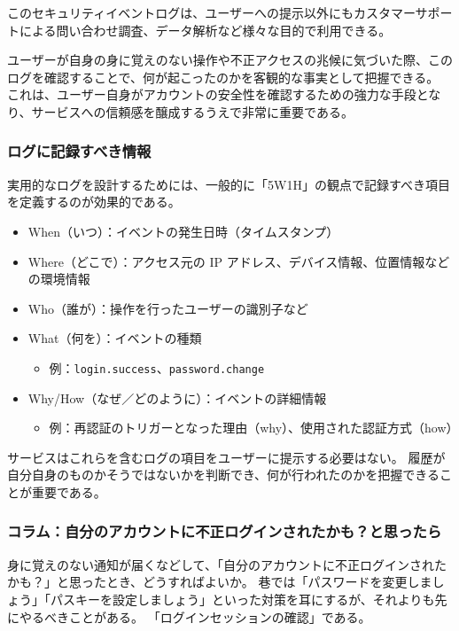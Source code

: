 \documentclass[uplatex]{jsarticle}
\def\label#1{}%
\begin{document}
このセキュリティイベントログは、ユーザーへの提示以外にもカスタマーサポートによる問い合わせ調査、データ解析など様々な目的で利用できる。

ユーザーが自身の身に覚えのない操作や不正アクセスの兆候に気づいた際、このログを確認することで、何が起こったのかを客観的な事実として把握できる。
これは、ユーザー自身がアカウントの安全性を確認するための強力な手段となり、サービスへの信頼感を醸成するうえで非常に重要である。

\subsubsection{ログに記録すべき情報}

実用的なログを設計するためには、一般的に「5W1H」の観点で記録すべき項目を定義するのが効果的である。
\begin{itemize}
\item When（いつ）：イベントの発生日時（タイムスタンプ）
\item Where（どこで）：アクセス元の IP アドレス、デバイス情報、位置情報などの環境情報
\item Who（誰が）：操作を行ったユーザーの識別子など
\item What（何を）：イベントの種類
  \begin{itemize}
  \item 例：\texttt{login.success}、\texttt{password.change}
  \end{itemize}
\item Why/How（なぜ／どのように）：イベントの詳細情報
  \begin{itemize}
  \item 例：再認証のトリガーとなった理由（why）、使用された認証方式（how）
  \end{itemize}
\end{itemize}

\begin{rem}[ユーザーに提示する範囲]\label{rem:ch3-security-log-display}
サービスはこれらを含むログの項目をユーザーに提示する必要はない。
履歴が自分自身のものかそうではないかを判断でき、何が行われたのかを把握できることが重要である。
\end{rem}

\subsubsection{コラム：自分のアカウントに不正ログインされたかも？と思ったら}\label{subsec:ch3-column}

身に覚えのない通知が届くなどして、「自分のアカウントに不正ログインされたかも？」と思ったとき、どうすればよいか。
巷では「パスワードを変更しましょう」「パスキーを設定しましょう」といった対策を耳にするが、それよりも先にやるべきことがある。
「ログインセッションの確認」である。
\end{document}
